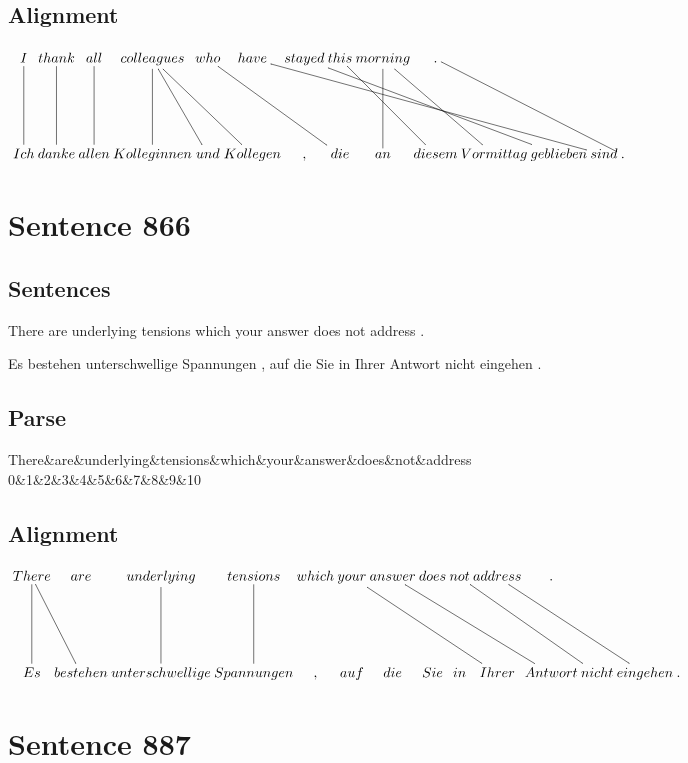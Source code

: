 \documentclass{report}
\begin{document}
\subsection*{Alignment}
\scriptsize{
$
\xymatrix@C-2.3pc{
I \ar @{-} [dd] & thank \ar @{-} [dd] & all \ar @{-} [dd] & colleagues \ar @{-} [dd] \ar @{-} [ddr] \ar @{-} [ddrr] & who \ar @{-} [ddrrr] & have \ar @{-} [ddrrrrrrr] & stayed \ar @{-} [ddrrrrr] & this \ar @{-} [ddrr] & morning \ar @{-} [ddrr] \ar @{-} [dd] & . \ar @{-} [ddrrrr]\\\\
Ich & danke & allen & Kolleginnen & und & Kollegen & , & die & an & diesem & Vormittag & geblieben & sind & .
}$}
\newpage\section*{Sentence 866}

\subsection*{Sentences}
There are underlying tensions which your answer does not address .

\noindent Es bestehen unterschwellige Spannungen , auf die Sie in Ihrer Antwort nicht eingehen .



\subsection*{Parse}
\begin{dependency}[theme=simple]
\begin{deptext}[column sep=.5cm, row sep=.1ex]
There\&are\&underlying\&tensions\&which\&your\&answer\&does\&not\&address\\
0\&1\&2\&3\&4\&5\&6\&7\&8\&9\&10\\
\end{deptext}
\end{dependency}


\subsection*{Alignment}
\scriptsize{
$
\xymatrix@C-2.3pc{
There \ar @{-} [ddr] \ar @{-} [dd] & are & underlying \ar @{-} [dd] & tensions \ar @{-} [dd] & which & your \ar @{-} [ddrrrr] & answer \ar @{-} [ddrrrr] & does & not \ar @{-} [ddrrr] & address \ar @{-} [ddrrr] & .\\\\
Es & bestehen & unterschwellige & Spannungen & , & auf & die & Sie & in & Ihrer & Antwort & nicht & eingehen & .
}$}
\newpage\section*{Sentence 887}
\end{document}
